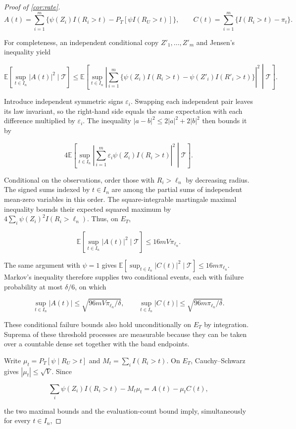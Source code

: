 \documentclass[12pt]{article}
\theoremstyle{plain}
\theoremstyle{definition}
\begin{document}
\begin{proof}[Proof of \cref{cor:rate}]
\[
A(t)=\sum_{i=1}^{m}\{\psi(Z_i)I(R_i>t)-P_T[\psi I(R_U>t)]\},\qquad C(t)=\sum_{i=1}^{m}\{I(R_i>t)-\pi_t\}.
\]

For completeness, an independent conditional copy $Z'_1,\ldots,Z'_m$ and Jensen's inequality yield

\[
\mathbb E[\sup_{t\in I_n}|A(t)|^2\mid\mathcal T]\leq\mathbb E\left[\sup_{t\in I_n}\left|\sum_{i=1}^{m}\{\psi(Z_i)I(R_i>t)-\psi(Z'_i)I(R'_i>t)\}\right|^2\middle|\mathcal T\right].
\]

Introduce independent symmetric signs $\varepsilon_i$. Swapping each independent pair leaves its law invariant, so the right-hand side equals the same expectation with each difference multiplied by $\varepsilon_i$. The inequality $|a-b|^2\leq2|a|^2+2|b|^2$ then bounds it by

\[
4\mathbb E\left[\sup_{t\in I_n}\left|\sum_{i=1}^{m}\varepsilon_i\psi(Z_i)I(R_i>t)\right|^2\middle|\mathcal T\right].
\]

Conditional on the observations, order those with $R_i>\ell_n$ by decreasing radius. The signed sums indexed by $t\in I_n$ are among the partial sums of independent mean-zero variables in this order. The square-integrable martingale maximal inequality bounds their expected squared maximum by $4\sum_i\psi(Z_i)^2I(R_i>\ell_n)$. Thus, on $E_T$,

\[
\mathbb E[\sup_{t\in I_n}|A(t)|^2\mid\mathcal T]\leq16mV\pi_{\ell_n}.
\]

The same argument with $\psi=1$ gives $\mathbb E[\sup_{t\in I_n}|C(t)|^2\mid\mathcal T]\leq16m\pi_{\ell_n}$. Markov's inequality therefore supplies two conditional events, each with failure probability at most $\delta/6$, on which

\[
\sup_{t\in I_n}|A(t)|\leq\sqrt{96mV\pi_{\ell_n}/\delta},\qquad \sup_{t\in I_n}|C(t)|\leq\sqrt{96m\pi_{\ell_n}/\delta}.
\]

These conditional failure bounds also hold unconditionally on $E_T$ by integration. Suprema of these threshold processes are measurable because they can be taken over a countable dense set together with the band endpoints. 

Write $\mu_t=P_T[\psi\mid R_U>t]$ and $M_t=\sum_i I(R_i>t)$. On $E_T$, Cauchy--Schwarz gives $|\mu_t|\leq\sqrt V$. Since

\[
\sum_i\psi(Z_i)I(R_i>t)-M_t\mu_t=A(t)-\mu_t C(t),
\]

the two maximal bounds and the evaluation-count bound imply, simultaneously for every $t\in I_n$,


\end{proof}
\end{document}
